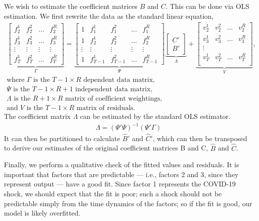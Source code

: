 \documentclass[11pt, letterpaper]{article}\usepackage[]{graphicx}\usepackage[]{color}
\begin{document}
We wish to estimate the coefficient matrices $B$ and $C$. This can be done via OLS estimation. We first rewrite the data as the standard linear equation,
\begin{align*}
\underbrace{\begin{bmatrix}
f^1_{2} & f^2_{2} & \dots & f^R_{2}\\
f^1_{3} & f^2_{3} & \dots & f^R_{3}\\
\vdots & \vdots & \vdots & \vdots \\
f^1_{T} & f^2_{T} & \dots & f^R_{T}
\end{bmatrix}}_{\Gamma}
=
\underbrace{\begin{bmatrix}
1 & f^1_{1} & f^2_{1} & \dots & f^R_{1}\\
1 & f^1_{2} & f^2_{2} & \dots & f^R_{2}\\
\vdots & \vdots & \vdots & \vdots & \vdots \\
1 & f^1_{T-1} & f^2_{T-1} & \dots & f^R_{T-1}
\end{bmatrix}}_{\Psi}
\underbrace{\begin{bmatrix}
C'\\
B'
\end{bmatrix}}_{\Lambda}
 +
\underbrace{\begin{bmatrix}
v^1_2 & v^2_2 & \dots & v^R_2\\
v^1_3 & v^2_3 & \dots & v^R_3\\
\vdots\\
v^1_T & v^2_T & \dots & v^R_T\\
\end{bmatrix}}_{V},\\
\text{where $\Gamma$ is the $T-1 \times R$ dependent data matrix,}\\
\text{$\Psi$ is the $T-1 \times R+1$ independent data matrix,}\\
\text{$\Lambda$ is the $R+1 \times R$ matrix of coefficient weightings,}\\
\text{and $V$ is the $T-1 \times R$ matrix of residuals.}
\end{align*}
The coefficient matrix $\Lambda$ can be estimated by the standard OLS estimator.
\begin{align*}
\widehat{\Lambda} = (\Psi' \Psi)^{-1} (\Psi'\Gamma)
\end{align*}
It can then be partitioned to calculate $\widehat{B}'$ and $\widehat{C}'$, which can then be transposed to derive our estimates of the original coefficient matrices B and C, $\widehat{B}$ and $\widehat{C}$.


Finally, we perform a qualitative check of the fitted values and residuals. It is important that factors that are predictable --- i.e., factors 2 and 3, since they represent output --- have a good fit. Since factor 1 represents the COVID-19 shock, we should expect that the fit is poor; such a shock should not be predictable simply from the time dynamics of the factors; so if the fit is good, our model is likely overfitted.
\end{document}
